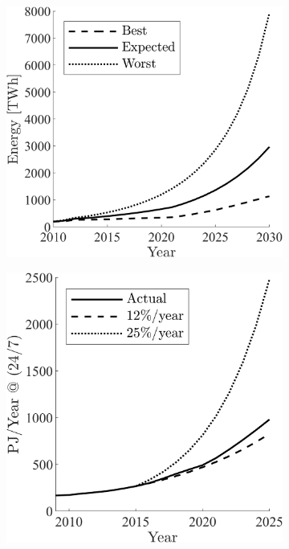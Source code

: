 \documentclass[12pt]{article}
\begin{document}
\begin{figure}[t!]
	\centering
	\hspace*{\fill}
	\begin{subfigure}[b]{0.30\textwidth}
		\subcaption{}
		\includegraphics[width= \textwidth]{data_center_energy_consumption.png} \label{fig:dataCenterEnergy}
	\end{subfigure}
	\hfill
	\begin{subfigure}[b]{0.30\textwidth}
		\subcaption{}
		\includegraphics[width=\textwidth]{ir_energy_projections.png} \label{fig:ir_energy}

\end{subfigure}
\end{figure}
\end{document}
